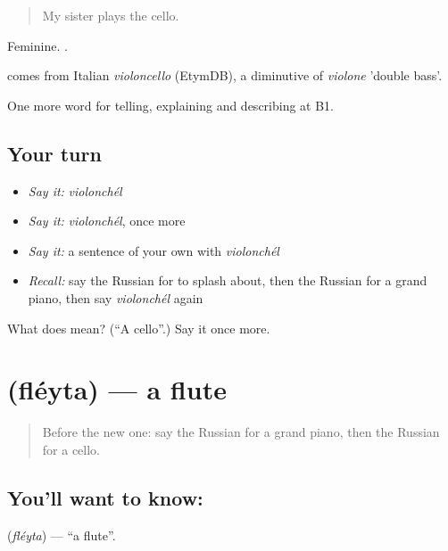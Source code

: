 \begin{quote}
My sister plays the cello.
\end{quote}

Feminine. \emph{  }.

\begin{cousinweb}
\emph{} comes from Italian \emph{violoncello} (EtymDB), a diminutive of \emph{violone} 'double bass'.
\end{cousinweb}

\begin{grammarlens}[title={What you've built}]
One more word for telling, explaining and describing at B1.
\end{grammarlens}

\subsection*{Your turn}
\begin{itemize}
\raggedright
  \item \emph{Say it:} \emph{violonchél}
  \item \emph{Say it:} \emph{violonchél}, once more
  \item \emph{Say it:} a sentence of your own with \emph{violonchél}
  \item \emph{Recall:} say the Russian for to splash about, then the Russian for a grand piano, then say \emph{violonchél} again
\end{itemize}

\begin{tcolorbox}[breakable,colback=teal!4,colframe=teal!35!black,title={Before you move on}]
What does  mean? (\textquotedblleft{}A cello\textquotedblright{}.) Say it once more.
\end{tcolorbox}
\section[\texorpdfstring{\ru{флейта} (fléyta)}{флейта (fléyta)}]{ (fléyta) — a flute}

\label{lesson:RU-C515-fleyta}



\begin{quote}
Before the new one: say the Russian for a grand piano, then the Russian for a cello.
\end{quote}

\subsection*{You'll want to know: }
\textbf{} (\emph{fléyta}) — \textquotedblleft{}a flute\textquotedblright{}.

